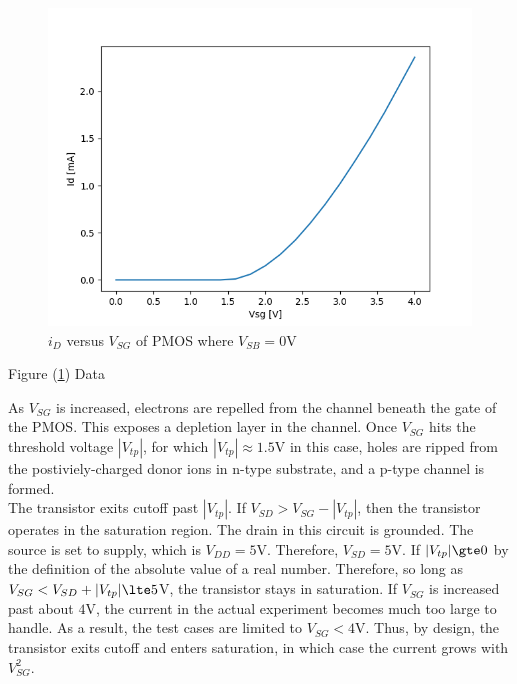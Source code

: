 
\FloatBarrier

\begin{figure}[h!]
	\centering
	\includegraphics[scale=0.75]{../images/data_3.PNG}
	\caption{$i_{D}$ versus $V_{SG}$ of PMOS where $V_{SB}= 0$\si{\volt}}
	\label{fig:data_3}
\end{figure}

\FloatBarrier

\FloatBarrier

\begin{table}[h!]
	\centering
	\caption{Figure (\ref{fig:data_3}) Data}
	\label{tab:data_3}
\end{table}

\FloatBarrier

As $V_{SG}$ is increased, electrons are repelled from the channel beneath the gate of the PMOS.
This exposes a depletion layer in the channel.
Once $V_{SG}$ hits the threshold voltage $|V_{tp}|$, for which $|V_{tp}| \approx 1.5$\si{\volt} in this case, holes are ripped from the postiviely-charged donor ions in n-type substrate, and a p-type channel is formed. \\

The transistor exits cutoff past $|V_{tp}|$.
If $V_{SD} > V_{SG} - |V_{tp}|$, then the transistor operates in the saturation region.
The drain in this circuit is grounded.
The source is set to supply, which is $V_{DD} = 5$\si{\volt}.
Therefore, $V_{SD} = 5$\si{\volt}.
If $|V_{tp}| \gte 0$ by the definition of the absolute value of a real number.
Therefore, so long as $V_{SG} < V_{SD} + |V_{tp}| \lte 5$\si{\volt}, the transistor stays in saturation.
If $V_{SG}$ is increased past about $4$\si{\volt}, the current in the actual experiment becomes much too large to handle.
As a result, the test cases are limited to $V_{SG} < 4$\si{\volt}.
Thus, by design, the transistor exits cutoff and enters saturation, in which case the current grows with $V_{SG}^{2}$. \\

